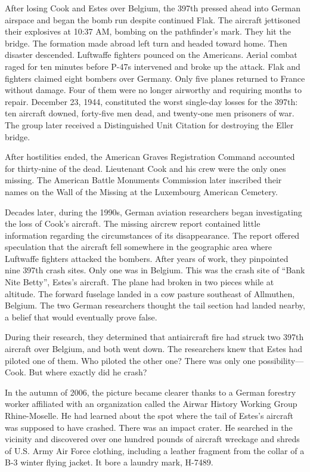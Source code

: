 \documentclass{article}
\begin{document}
\begin{multicols}{3}
After losing Cook and Estes over Belgium, the 397th pressed ahead into German airspace and began the bomb run despite continued Flak. The aircraft jettisoned their explosives at 10:37 AM, bombing on the pathfinder’s mark. They hit the bridge. The formation made abroad left turn and headed toward home. Then disaster descended. Luftwaffe fighters pounced on the Americans. Aerial combat raged for ten minutes before P-47s intervened and broke up the attack. Flak and fighters claimed eight bombers over Germany. Only five planes returned to France without damage. Four of them were no longer airworthy and requiring months to repair. December 23, 1944, constituted the worst single-day losses for the 397th: ten aircraft downed, forty-five men dead, and twenty-one men prisoners of war. The group later received a Distinguished Unit Citation for destroying the Eller bridge.

After hostilities ended, the American Graves Registration Command accounted for thirty-nine of the dead. Lieutenant Cook and his crew were the only ones missing. The American Battle Monuments Commission later inscribed their names on the Wall of the Missing at the Luxembourg American Cemetery.

Decades later, during the 1990s, German aviation researchers began investigating the loss of Cook’s aircraft. The missing aircrew report contained little information regarding the circumstances of its disappearance. The report offered speculation that the aircraft fell somewhere in the geographic area where Luftwaffe fighters attacked the bombers. After years of work, they pinpointed nine 397th crash sites. Only one was in Belgium. This was the crash site of “Bank Nite Betty”, Estes’s aircraft. The plane had broken in two pieces while at altitude. The forward fuselage landed in a cow pasture southeast of Allmuthen, Belgium. The two German researchers thought the tail section had landed nearby, a belief that would eventually prove false.

During their research, they determined that antiaircraft fire had struck two 397th aircraft over Belgium, and both went down. The researchers knew that Estes had piloted one of them. Who piloted the other one? There was only one possibility—Cook. But where exactly did he crash?

In the autumn of 2006, the picture became clearer thanks to a German forestry worker affiliated with an organization called the Airwar History Working Group Rhine-Moselle. He had learned about the spot where the tail of Estes’s aircraft was supposed to have crashed. There was an impact crater. He searched in the vicinity and discovered over one hundred pounds of aircraft wreckage and shreds of U.S. Army Air Force clothing, including a leather fragment from the collar of a B-3 winter flying jacket. It bore a laundry mark, H-7489.


\end{multicols}
\end{document}
